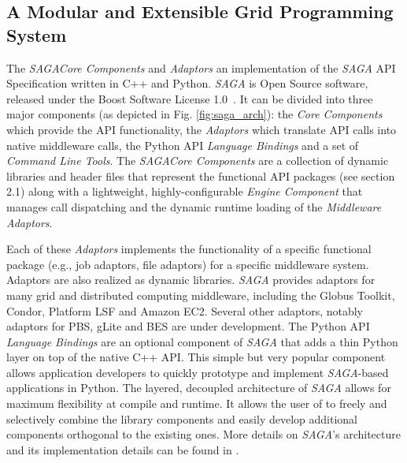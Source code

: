 \documentclass[a4paper,10pt]{article}
\newcommand{\I}[1]{\textit{#1}}
\newcommand{\sagaspec}{\textit{SAGA}\xspace}
\newcommand{\sagaimpl}{\textit{SAGA}\xspace}
\newcommand{\spec}{\sagaspec}
\newcommand{\impl}{\sagaimpl}
\begin{document}
\vspace{-0.8em}


\subsection*{A Modular and Extensible Grid Programming System}
\vspace{-0.5em}
The \impl \I{Core Components} and \I{Adaptors} an implementation
of the \spec API Specification written in C++ and Python. \impl is
Open Source software, released under the Boost Software
License 1.0~\cite{boost_license_web}. It can be divided into
three major components (as depicted in Fig. \ref{fig:saga_arch}):
the \I{Core Components} which provide the API functionality, the
\I{Adaptors} which translate API calls into native middleware calls,
the Python API \I{Language Bindings} and a set of \I{Command Line
  Tools}. The \impl \I{Core Components} are a collection of dynamic
libraries and header files that represent the functional API packages
(see section 2.1) along with a lightweight, highly-configurable
\I{Engine Component} that manages call dispatching and the dynamic
runtime loading of the \I{Middleware Adaptors}.


Each of these \I{Adaptors} implements the functionality of a specific
functional package (e.g., job adaptors, file adaptors) for a specific
middleware system. Adaptors are also realized as dynamic
libraries. \impl provides adaptors for many grid and distributed
computing middleware, including the Globus Toolkit, Condor, Platform
LSF and Amazon EC2. Several other adaptors, notably adaptors for PBS,
gLite and BES are under development. The Python API \I{Language
  Bindings} are an optional component of \impl that adds a thin Python
layer on top of the native C++ API. This simple but very popular
component allows application developers to quickly prototype and
implement \impl-based applications in Python.  The layered, decoupled
architecture of \impl allows for maximum flexibility at compile and
runtime. It allows the user of to freely and selectively combine the
library components and easily develop additional components orthogonal
to the existing ones. More details on \impl's architecture and its
implementation details can be found in \cite{OOPSLA_PAPER}.

\vspace{-0.8em}
\end{document}
